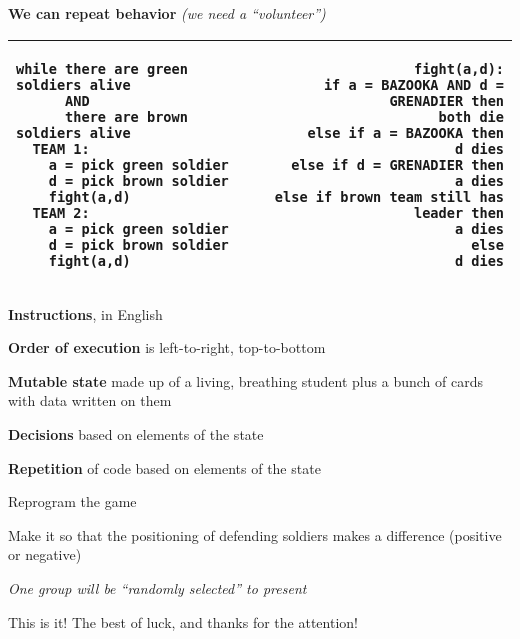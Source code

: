 \documentclass{beamer}
\begin{document}
\begin{frame}[fragile]
\textbf{We can repeat behavior} \textit{(we need a ``volunteer'')} \ \\

\begin{tabular}{| l | r |}
\hline
\begin{lstlisting}[basicstyle=\ttfamily\tiny]
while there are green soldiers alive
      AND
      there are brown soldiers alive
  TEAM 1:
    a = pick green soldier
    d = pick brown soldier
    fight(a,d)
  TEAM 2:
    a = pick green soldier
    d = pick brown soldier
    fight(a,d)
\end{lstlisting}

&

\begin{lstlisting}[basicstyle=\ttfamily\tiny]
fight(a,d):
  if a = BAZOOKA AND d = GRENADIER then
    both die
  else if a = BAZOOKA then
    d dies
  else if d = GRENADIER then
    a dies
  else if brown team still has leader then
    a dies
  else
    d dies
\end{lstlisting} 

\\

\hline
\end{tabular}
\end{frame}

\begin{slide}{
\item \textbf{Instructions}, in English
\item \textbf{Order of execution} is left-to-right, top-to-bottom
\item \textbf{Mutable state} made up of a living, breathing student plus a bunch of cards with data written on them
\item \textbf{Decisions} based on elements of the state 
\item \textbf{Repetition} of code based on elements of the state 
}\end{slide}

\begin{slide}{
\item Reprogram the game
\item Make it so that the positioning of defending soldiers makes a difference (positive or negative)
\item \textit{One group will be ``randomly selected'' to present}
}\end{slide}

\begin{frame}{This is it!}
\center
\fontsize{18pt}{7.2}\selectfont
The best of luck, and thanks for the attention!
\end{frame}
\end{document}
